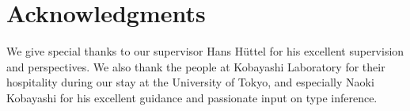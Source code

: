 \documentclass[11pt,a4paper,oldfontcommands]{memoir}
\theoremstyle{proposition}
\theoremstyle{proposition}
\theoremstyle{definition}
\theoremstyle{plain}
\theoremstyle{remark}
\theoremstyle{definition}
\begin{document}
\text{ }
\vspace{50em}
\section*{Acknowledgments}
We give special thanks to our supervisor Hans Hüttel for his excellent supervision and perspectives. We also thank the people at Kobayashi Laboratory for their hospitality during our stay at the University of Tokyo, and especially Naoki Kobayashi for his excellent guidance and passionate input on type inference.
\clearpage

\setcounter{tocdepth}{1}
\tableofcontents*
\clearpage










%
%



\appendix



%
%
%
\end{document}
